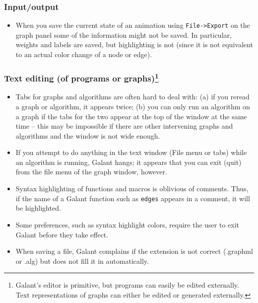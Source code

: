 
\subsubsection*{Input/output}

\begin{itemize}

\item
When you save the current state of an animation using \texttt{File->Export}
on the graph panel some of the information might not be saved.
In particular, weights and labels are saved, but highlighting is not (since it is not equivalent to an actual color change of a node or edge).

\end{itemize}

\subsubsection*{Text editing (of programs or graphs)\footnote{
Galant's editor  is primitive, but
programs can easily be edited externally.
Text representations of graphs can either be edited or generated externally.}}

\begin{itemize}

\item Tabs for graphs and algorithms are often hard to deal with: (a) if you
  reread a graph or algorithm, it appears twice; (b) you can only run an
  algorithm on a graph if the tabs for the two appear at the top of the
  window at the same time -- this
  may be impossible if there are other intervening graphs and algorithms
  and the window is not wide enough.

\item If you attempt to do anything in the text window (File menu or tabs)
  while an algorithm is running, Galant hangs;
  it appears that you can exit (quit) from
  the file menu of the graph window, however.

\item
  Syntax highlighting of functions and macros is oblivious of comments.
  Thus, if the name of a Galant function
  such as \texttt{edges} appears in a comment,
  it will be highlighted.

\item
  Some preferences, such as syntax highlight colors, require the user to exit Galant before
  they take effect.

\item
  When saving a file, Galant complains if the extension is not correct (\textsf{.graphml}
  or \textsf{.alg}) but does not fill it in automatically.

\end{itemize}

